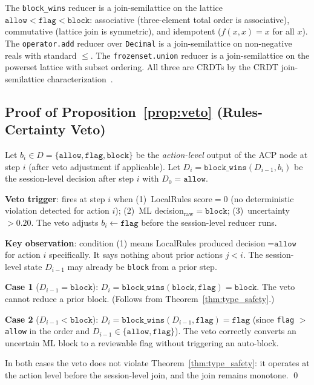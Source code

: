 \documentclass{article}
\begin{document}
The \texttt{block\_wins} reducer is a join-semilattice on the lattice $\texttt{allow} < \texttt{flag} < \texttt{block}$: associative (three-element total order is associative), commutative (lattice join is symmetric), and idempotent ($f(x,x) = x$ for all $x$). The \texttt{operator.add} reducer over \texttt{Decimal} is a join-semilattice on non-negative reals with standard $\leq$. The \texttt{frozenset.union} reducer is a join-semilattice on the powerset lattice with subset ordering. All three are CRDTs by the CRDT join-semilattice characterization~\cite{crdts}.

\subsection{Proof of Proposition~\ref{prop:veto} (Rules-Certainty Veto)}

Let $b_i \in D = \{\texttt{allow}, \texttt{flag}, \texttt{block}\}$ be the \emph{action-level} output of the ACP node at step $i$ (after veto adjustment if applicable). Let $D_i = \texttt{block\_wins}(D_{i-1}, b_i)$ be the session-level decision after step $i$ with $D_0 = \texttt{allow}$.

\textbf{Veto trigger}: fires at step $i$ when (1)~LocalRules score$=0$ (no deterministic violation detected for action $i$); (2)~ML decision$_{\mathrm{raw}} = \texttt{block}$; (3)~uncertainty $> 0.20$. The veto adjusts $b_i \leftarrow \texttt{flag}$ before the session-level reducer runs.

\textbf{Key observation}: condition (1) means LocalRules produced decision$=\texttt{allow}$ for action $i$ specifically. It says nothing about prior actions $j < i$. The session-level state $D_{i-1}$ may already be \texttt{block} from a prior step.

\textbf{Case 1} ($D_{i-1} = \texttt{block}$): $D_i = \texttt{block\_wins}(\texttt{block}, \texttt{flag}) = \texttt{block}$. The veto cannot reduce a prior block. (Follows from Theorem~\ref{thm:type_safety}.)

\textbf{Case 2} ($D_{i-1} < \texttt{block}$): $D_i = \texttt{block\_wins}(D_{i-1}, \texttt{flag}) = \texttt{flag}$ (since \texttt{flag} $>$ \texttt{allow} in the order and $D_{i-1} \in \{\texttt{allow}, \texttt{flag}\}$). The veto correctly converts an uncertain ML block to a reviewable flag without triggering an auto-block.

In both cases the veto does not violate Theorem~\ref{thm:type_safety}: it operates at the action level before the session-level join, and the join remains monotone. \qed
\end{document}
